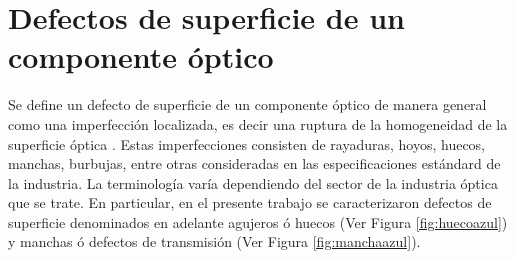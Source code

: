 \singlespacing
\section{Defectos de superficie de un componente óptico}
\label{sec:defectsurf}

\hspace{0.5cm}Se define un defecto de superficie de un componente óptico de manera general como una imperfección localizada, es decir una ruptura de la homogeneidad de la superficie óptica \cite{Gomez_1998}. Estas imperfecciones consisten de rayaduras, hoyos, huecos, manchas, burbujas, entre otras consideradas en las especificaciones estándard de la industria. La terminología varía dependiendo del sector de la industria óptica que se trate. En particular, en el presente trabajo se caracterizaron defectos de superficie denominados en adelante agujeros ó huecos (Ver Figura \ref{fig:huecoazul}) y manchas ó defectos de transmisión (Ver Figura \ref{fig:manchaazul}).  

\begin{figure}[H]
	\begin{floatrow}
	\end{floatrow}
\end{figure}

